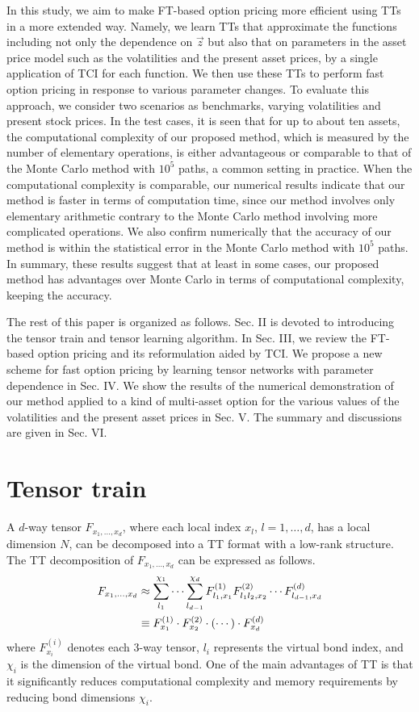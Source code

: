 In this study, we aim to make FT-based option pricing more efficient using TTs in a more extended way. 
Namely, we learn TTs that approximate the functions including not only the dependence on  $\vec{z}$ but also that on parameters in the asset price model such as the volatilities and the present asset prices, by a single application of TCI for each function.
We then use these TTs to perform fast option pricing in response to various parameter changes.
To evaluate this approach, we consider two scenarios as benchmarks, varying volatilities and present stock prices.
In the test cases, it is seen that for up to about ten assets, the computational complexity of our proposed method, which is measured by the number of elementary operations, is either advantageous or comparable to that of the Monte Carlo method with $10^5$ paths, a common setting in practice.
When the computational complexity is comparable, our numerical results indicate that our method is faster in terms of computation time, since our method involves only elementary arithmetic contrary to the Monte Carlo method involving more complicated operations.
We also confirm numerically that the accuracy of our method is within the statistical error in the Monte Carlo method with $10^5$ paths.
In summary, these results suggest that at least in some cases, our proposed method has advantages over Monte Carlo in terms of computational complexity, keeping the accuracy.

The rest of this paper is organized as follows.
Sec. II is devoted to introducing the tensor train and tensor learning algorithm. 
In Sec. III, we review the FT-based option pricing and its reformulation aided by TCI.
We propose a new scheme for fast option pricing by learning tensor networks with parameter dependence in Sec. IV.  We show the results of the numerical demonstration of our method applied to a kind of multi-asset option for the various values of the volatilities and the present asset prices in Sec. V.
The summary and discussions are given in Sec. VI.

\section{Tensor train}
A $d$-way tensor $F_{x_1, \dots, x_d}$, where each local index $x_l$, $l=1, \dots, d$, has a local dimension $N$, can be decomposed into a TT format with a low-rank structure. 
The TT decomposition of $F_{x_1, \ldots, x_d}$ can be expressed as follows. 
\begin{align}
    F_{x_1, \ldots, x_d} &\approx \sum_{l_1}^{\chi_1} \cdots \sum_{l_{d-1}}^{\chi_d} F_{l_1, x_1}^{(1)} F_{l_1 l_2, x_2}^{(2)} \cdots F_{l_{d-1}, x_d}^{(d)} \notag \\
    &\equiv 
    F_{x_1}^{(1)} \cdot F_{x_2}^{(2)} \cdot (\cdots) \cdot F_{x_d}^{(d)}
\end{align}
where $F_{x_i}^{(i)}$ denotes each 3-way tensor, $l_i$ represents the virtual bond index, and $\chi_i$ is the dimension of the virtual bond. 
One of the main advantages of TT is that it significantly reduces computational complexity and memory requirements by reducing bond dimensions $\chi_i$. 

